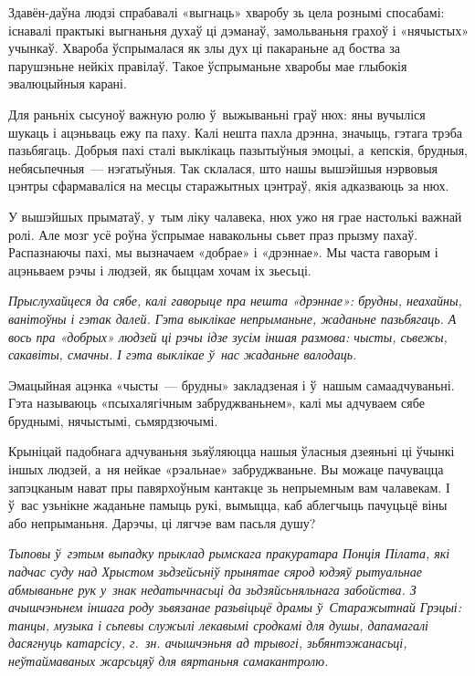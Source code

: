 Здавён-даўна людзі спрабавалі «выгнаць» хваробу зь цела рознымі спосабамі: існавалі практыкі выгнаньня духаў ці дэманаў, замольваньня грахоў і «нячыстых» учынкаў. Хвароба ўспрымалася як злы дух ці пакараньне ад боства за парушэньне нейкіх правілаў. Такое ўспрыманьне хваробы мае глыбокія эвалюцыйныя карані.

Для раньніх сысуноў важную ролю ў~выжываньні граў нюх: яны вучыліся шукаць і ацэньваць ежу па паху. Калі нешта пахла дрэнна, значыць, гэтага трэба пазьбягаць. Добрыя пахі сталі выклікаць пазытыўныя эмоцыі, а~кепскія, брудныя, небясьпечныя~--- нэгатыўныя. Так склалася, што нашы вышэйшыя нэрвовыя цэнтры сфармаваліся на месцы старажытных цэнтраў, якія адказваюць за нюх.

У вышэйшых прыматаў, у~тым ліку чалавека, нюх ужо ня грае настолькі важнай ролі. Але мозг усё роўна ўспрымае навакольны сьвет праз прызму пахаў. Распазнаючы пахі, мы вызначаем «добрае» і «дрэннае». Мы часта гаворым і ацэньваем рэчы і людзей, як быццам хочам іх зьесьці.

\emph{Прыслухайцеся да сябе, калі гаворыце пра нешта «дрэннае»: брудны, неахайны, ванітоўны і гэтак далей. Гэта выклікае непрыманьне, жаданьне пазьбягаць. А вось пра «добрых» людзей ці рэчы ідзе зусім іншая размова: чысты, сьвежы, сакавіты, смачны. І гэта выклікае ў~нас жаданьне валодаць.} 

Эмацыйная ацэнка «чысты~--- брудны» закладзеная і ў~нашым самаадчуваньні. Гэта называюць «псыхалягічным забруджваньнем», калі мы адчуваем сябе бруднымі, нячыстымі, сьмярдзючымі.


Крыніцай падобнага адчуваньня зьяўляюцца нашыя ўласныя дзеяньні ці ўчынкі іншых людзей, а~ня нейкае «рэальнае» забруджваньне. Вы можаце пачувацца запэцканым нават пры павярхоўным кантакце зь непрыемным вам чалавекам. І ў~вас узьнікне жаданьне памыць рукі, вымыцца, каб аблегчыць пачуцьцё віны або непрыманьня. Дарэчы, ці лягчэе вам пасьля душу?

\emph{Тыповы ў~гэтым выпадку прыклад рымскага пракуратара Понція Пілата, які падчас суду над Хрыстом зьдзейсьніў прынятае сярод юдэяў рытуальнае абмываньне рук у~знак недатычнасьці да зьдзяйсьняльнага забойства. З ачышчэньнем іншага роду зьвязанае разьвіцьцё драмы ў~Старажытнай Грэцыі: танцы, музыка і сьпевы служылі лекавымі сродкамі для душы, дапамагалі дасягнуць катарсісу, г.~зн. ачышчэньня ад трывогі, зьбянтэжанасьці, неўтаймаваных жарсьцяў для вяртаньня самакантролю.}

